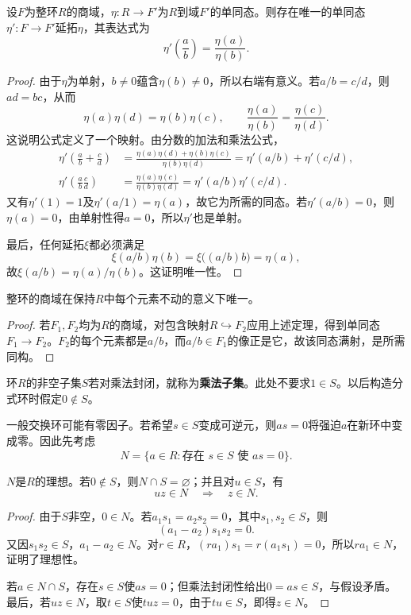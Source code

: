 \begin{theorem}\label{p2:fraction-field-extension}
设$F$为整环$R$的商域，$\eta:R\to F'$为$R$到域$F'$的单同态。则存在唯一的单同态$\eta':F\to F'$延拓$\eta$，其表达式为
\[
\eta'\left(\frac ab\right)=\frac{\eta(a)}{\eta(b)}.
\]
\end{theorem}
\begin{proof}
由于$\eta$为单射，$b\ne0$蕴含$\eta(b)\ne0$，所以右端有意义。若$a/b=c/d$，则$ad=bc$，从而
\[
\eta(a)\eta(d)=\eta(b)\eta(c),\qquad
\frac{\eta(a)}{\eta(b)}=\frac{\eta(c)}{\eta(d)}.
\]
这说明公式定义了一个映射。由分数的加法和乘法公式，
\begin{align*}
\eta'\left(\frac ab+\frac cd\right)
&=\frac{\eta(a)\eta(d)+\eta(b)\eta(c)}{\eta(b)\eta(d)}
=\eta'(a/b)+\eta'(c/d),\\
\eta'\left(\frac ab\frac cd\right)
&=\frac{\eta(a)\eta(c)}{\eta(b)\eta(d)}
=\eta'(a/b)\eta'(c/d).
\end{align*}
又有$\eta'(1)=1$及$\eta'(a/1)=\eta(a)$，故它为所需的同态。若$\eta'(a/b)=0$，则$\eta(a)=0$，由单射性得$a=0$，所以$\eta'$也是单射。

最后，任何延拓$\xi$都必须满足
\[
\xi(a/b)\eta(b)=\xi\bigl((a/b)b\bigr)=\eta(a),
\]
故$\xi(a/b)=\eta(a)/\eta(b)$。这证明唯一性。
\end{proof}

\begin{corollary}
整环的商域在保持$R$中每个元素不动的意义下唯一。
\end{corollary}
\begin{proof}
若$F_1,F_2$均为$R$的商域，对包含映射$R\hookrightarrow F_2$应用上述定理，得到单同态$F_1\to F_2$。$F_2$的每个元素都是$a/b$，而$a/b\in F_1$的像正是它，故该同态满射，是所需同构。
\end{proof}

\begin{definition}
环$R$的非空子集$S$若对乘法封闭，就称为\textbf{乘法子集}。此处不要求$1\in S$。以后构造分式环时假定$0\notin S$。
\end{definition}

一般交换环可能有零因子。若希望$s\in S$变成可逆元，则$as=0$将强迫$a$在新环中变成零。因此先考虑
\[
N=\{a\in R:\text{存在 }s\in S\text{ 使 }as=0\}.
\]

\begin{lemma}
$N$是$R$的理想。若$0\notin S$，则$N\cap S=\varnothing$；并且对$u\in S$，有
\[
uz\in N\quad\Longrightarrow\quad z\in N.
\]
\end{lemma}
\begin{proof}
由于$S$非空，$0\in N$。若$a_1s_1=a_2s_2=0$，其中$s_1,s_2\in S$，则
\[
(a_1-a_2)s_1s_2=0.
\]
又因$s_1s_2\in S$，$a_1-a_2\in N$。对$r\in R$，$(ra_1)s_1=r(a_1s_1)=0$，所以$ra_1\in N$，证明了理想性。

若$a\in N\cap S$，存在$s\in S$使$as=0$；但乘法封闭性给出$0=as\in S$，与假设矛盾。最后，若$uz\in N$，取$t\in S$使$tuz=0$，由于$tu\in S$，即得$z\in N$。
\end{proof}

